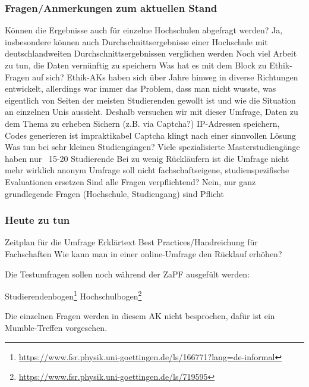      \subsubsection*{Fragen/Anmerkungen zum aktuellen Stand}
        \begin{outline}
          \1 Können die Ergebnisse auch für einzelne Hochschulen abgefragt werden?
            \2 Ja, insbesondere können auch Durchschnittsergebnisse einer Hochschule mit deutschlandweiten Durchschnittsergebnissen verglichen werden
            \2 Noch viel Arbeit zu tun, die Daten vernünftig zu speichern
          \1 Was hat es mit dem Block zu Ethik-Fragen auf sich?
            \2 Ethik-AKs haben sich über Jahre hinweg in diverse Richtungen entwickelt, allerdings war immer das Problem, dass man nicht wusste, was eigentlich von Seiten der meisten Studierenden gewollt ist und wie die Situation an einzelnen Unis aussieht.
            \2 Deshalb versuchen wir mit dieser Umfrage, Daten zu dem Thema zu erheben
          \1 Sichern (z.B. via Captcha?)
            \2 IP-Adressen speichern, Codes generieren ist impraktikabel
            \2 Captcha klingt nach einer sinnvollen Lösung
          \1 Was tun bei sehr kleinen Studiengängen?
            \2 Viele spezialisierte Masterstudiengänge haben nur ~15-20 Studierende
            \2 Bei zu wenig Rückläufern ist die Umfrage nicht mehr wirklich anonym
            \2 Umfrage soll nicht fachschaftseigene, studienspezifische Evaluationen ersetzen
          \1 Sind alle Fragen verpflichtend?
            \2 Nein, nur ganz grundlegende Fragen (Hochschule, Studiengang) sind Pflicht
        \end{outline}

      \subsubsection*{Heute zu tun}
        \begin{outline}
          \1 Zeitplan für die Umfrage
          \1 Erklärtext
          \1 Best Practices/Handreichung für Fachschaften
            \2Wie kann man in einer online-Umfrage den Rücklauf erhöhen?
        \end{outline}

        Die Testumfragen sollen noch während der ZaPF ausgefült werden:
        \begin{outline}
          \1 Studierendenbogen\footnote{\url{https://www.fsr.physik.uni-goettingen.de/ls/166771?lang=de-informal}}
          \1 Hochschulbogen\footnote{\url{https://www.fsr.physik.uni-goettingen.de/ls/719595}}
        \end{outline}
        Die einzelnen Fragen werden in diesem AK nicht besprochen, dafür ist ein Mumble-Treffen vorgesehen.

